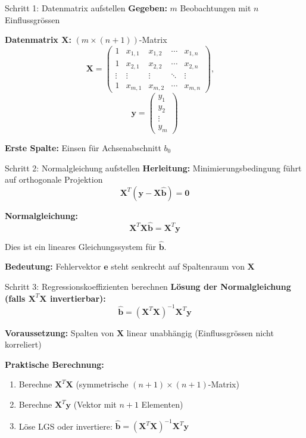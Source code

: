 \documentclass[a4paper, fontsize=7pt]{scrartcl}
\begin{document}
\begin{mainbox}{Schritt 1: Datenmatrix aufstellen}
\textbf{Gegeben:} $m$ Beobachtungen mit $n$ Einflussgrössen

\textbf{Datenmatrix $\mathbf{X}$:} $(m \times (n+1))$-Matrix
\[\mathbf{X} = \begin{pmatrix}
1 & x_{1,1} & x_{1,2} & \cdots & x_{1,n} \\
1 & x_{2,1} & x_{2,2} & \cdots & x_{2,n} \\
\vdots & \vdots & \vdots & \ddots & \vdots \\
1 & x_{m,1} & x_{m,2} & \cdots & x_{m,n}
\end{pmatrix}, \quad \]
\[\mathbf{y} = \begin{pmatrix}
y_1 \\ y_2 \\ \vdots \\ y_m
\end{pmatrix}\]

\textbf{Erste Spalte:} Einsen für Achsenabschnitt $b_0$
\end{mainbox}

\begin{mainbox}{Schritt 2: Normalgleichung aufstellen}
\textbf{Herleitung:} Minimierungsbedingung führt auf orthogonale Projektion
\[\mathbf{X}^T(\mathbf{y} - \mathbf{X}\hat{\mathbf{b}}) = \mathbf{0}\]

\textbf{Normalgleichung:}
\[\mathbf{X}^T\mathbf{X}\hat{\mathbf{b}} = \mathbf{X}^T\mathbf{y}\]

Dies ist ein lineares Gleichungssystem für $\hat{\mathbf{b}}$.

\textbf{Bedeutung:} Fehlervektor $\mathbf{e}$ steht senkrecht auf Spaltenraum von $\mathbf{X}$
\end{mainbox}

\begin{mainbox}{Schritt 3: Regressionskoeffizienten berechnen}
\textbf{Lösung der Normalgleichung (falls $\mathbf{X}^T\mathbf{X}$ invertierbar):}
\[\hat{\mathbf{b}} = (\mathbf{X}^T\mathbf{X})^{-1}\mathbf{X}^T\mathbf{y}\]

\textbf{Voraussetzung:} Spalten von $\mathbf{X}$ linear unabhängig (Einflussgrössen nicht korreliert)

\textbf{Praktische Berechnung:}
\begin{enumerate}
    \item Berechne $\mathbf{X}^T\mathbf{X}$ (symmetrische $(n+1) \times (n+1)$-Matrix)
    \item Berechne $\mathbf{X}^T\mathbf{y}$ (Vektor mit $n+1$ Elementen)
    \item Löse LGS oder invertiere: $\hat{\mathbf{b}} = (\mathbf{X}^T\mathbf{X})^{-1}\mathbf{X}^T\mathbf{y}$
\end{enumerate}
\end{mainbox}
\end{document}
